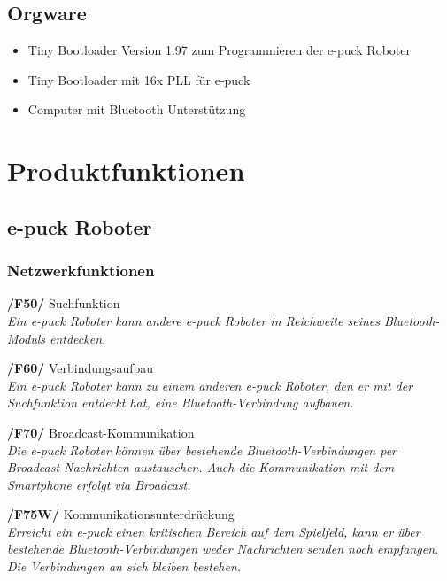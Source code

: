 \documentclass[10pt,a4paper]{article}
\let\oldsection\section
\renewcommand{\section}{\newpage \oldsection}
\begin{document}
		\subsection{Orgware}
			\begin{itemize}
				\item Tiny Bootloader Version 1.97 zum Programmieren der e-puck Roboter
				\item Tiny Bootloader mit 16x PLL für e-puck					
				\item Computer mit Bluetooth Unterstützung	
			\end{itemize}		
	\section{Produktfunktionen}
		\subsection{e-puck Roboter}
			\subsubsection{Netzwerkfunktionen}
				\begin{list}{}{\leftmargin=1cm}
					\item[\textbf{/F50/}] Suchfunktion
						\\ \textsl{Ein e-puck Roboter kann andere e-puck Roboter in Reichweite seines Bluetooth-Moduls entdecken.}
					\item[\textbf{/F60/}] Verbindungsaufbau
						\\ \textsl{Ein e-puck Roboter kann zu einem anderen e-puck Roboter, den er mit der Suchfunktion entdeckt
						hat, eine Bluetooth-Verbindung aufbauen.}
					\item[\textbf{/F70/}] Broadcast-Kommunikation
						\\ \textsl{Die e-puck Roboter können über bestehende Bluetooth-Verbindungen per Broadcast
						Nachrichten austauschen. Auch die Kommunikation mit dem Smartphone erfolgt via Broadcast.}
					\item[\textbf{/F75W/}] Kommunikationsunterdrückung
						\\ \textsl{Erreicht ein e-puck einen kritischen Bereich auf dem Spielfeld, kann er über bestehende
						Bluetooth-Verbindungen weder Nachrichten senden noch empfangen. Die Verbindungen an sich bleiben bestehen.}
				\end{list}
\end{document}
